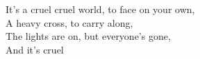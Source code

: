 It's a cruel cruel world, to face on your own, \\
A heavy cross, to carry along, \\
The lights are on, but everyone's gone, \\
And it's cruel